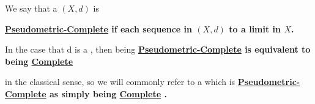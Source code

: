\label{def:pseudometriccomplete}
\newcommand{\PseudometricComplete}[0]{
    \bf \hyperref[def:pseudometriccomplete]{Pseudometric-Complete} \rm
}
\newcommand{\Complete}[0]{
    \bf \hyperref[def:pseudometriccomplete]{Complete} \rm
}
\begin{df}
    We say that a \PseudometricSpace $(X,d)$ is 
    \PseudometricComplete if each 
	\PseudometricCauchySequence 
	sequence in $(X,d)$ 
	\PseudometricConverges to a limit in $X$.


	In the case that d is a \Metric, then
	being \PseudometricComplete is 
	equivalent to being \Complete
	in the classical sense, so 
	we will commonly refer to a \PseudometricSpace
	which is \PseudometricComplete as simply
	being \Complete. 
    \end{df}
